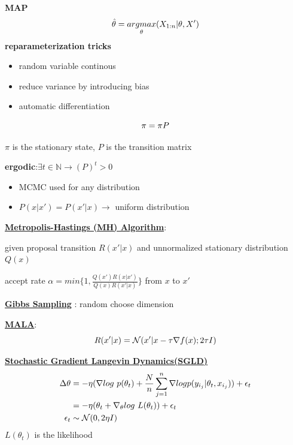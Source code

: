 \documentclass[landscape,a0paper,fontscale=0.285]{baposter} %
\newcommand{\compresslist}{ %
\setlength{\itemsep}{1pt}
\setlength{\parskip}{0pt}
\setlength{\parsep}{0pt}
}
\begin{document}
\begin{poster}
{\textbf{MAP}
\vspace{-0.3cm}
$$\vspace{-0.2cm}
\hat \theta = \underset{\theta}{argmax}(X_{1:n}|\theta,X')
$$
\textbf{reparameterization tricks}\vspace{-0.3cm}
\begin{itemize} \compresslist
    \item  random variable continous
    \item reduce variance by introducing bias
    \item automatic differentiation
\end{itemize}\vspace{-0.2cm}
\colorbox[HTML]{CCFFFF}{}
\vspace{-0.4cm}
$$\vspace{-0.3cm}
\pi = \pi P
$$

$\pi$ is the stationary state, $P$ is the transition matrix

\textbf{ergodic}:$\exists t\in \mathbb N \rightarrow (P)^t >0$
\vspace{-0.3cm}

\begin{itemize}\compresslist
    \item MCMC used for any distribution
    \item $P(x|x') = P(x'|x)\rightarrow$ uniform distribution
\end{itemize}
\vspace{-0.3cm}

\underline{\textbf{Metropolis-Hastings (MH) Algorithm}}:

given proposal transition $R(x'|x)$ and unnormalized stationary distribution $Q(x)$

accept rate $\alpha = min\{1, \frac{Q(x')R(x|x')}{Q(x)R(x'|x)}\}$ from $x$ to $x'$

\underline{\textbf{Gibbs Sampling}} : random choose dimension

\underline{\textbf{MALA}}:
\vspace{-0.6cm}
$$\vspace{-0.3cm}
R(x'|x) = \mathcal N(x'|x-\tau \nabla f(x) ;2\tau I)
$$

\underline{\textbf{Stochastic Gradient Langevin Dynamics(SGLD)}}
\vspace{-0.4cm}
$$\vspace{-0.3cm}
\begin{aligned}
\Delta\theta &=  -\eta(\nabla log~p(\theta_t) + \frac{N}{n}\sum_{j=1}^n \nabla  log p(y_{i_{j}} | \theta_t, x_{i_j})) + \epsilon_t \\
& = -\eta(\theta_t + \nabla_\theta log~L(\theta_t)) + \epsilon_t\\
\epsilon_t &\sim \mathcal N(0, 2\eta I)\\
\end{aligned}
$$
$L(\theta_t)$ is the likelihood

}
\end{poster}
\end{document}
